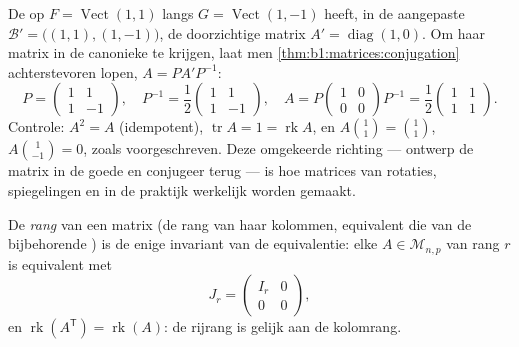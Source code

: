 \begin{example}
\label{ex:b1:matrices:reverserun}
De  op $F = \operatorname{Vect}(1,1)$ langs $G =
\operatorname{Vect}(1,-1)$ heeft, in de aangepaste  $\mathcal
B' = \bigl((1,1),(1,-1)\bigr)$, de doorzichtige matrix $A' =
\operatorname{diag}(1, 0)$. Om haar matrix in de canonieke  te
krijgen, laat men \cref{thm:b1:matrices:conjugation} achterstevoren
lopen, $A = P A' P^{-1}$:
\[
P = \begin{pmatrix} 1 & 1\\ 1 & -1\end{pmatrix},
\quad
P^{-1} = \frac12\begin{pmatrix} 1 & 1\\ 1 & -1\end{pmatrix},
\quad
A = P\begin{pmatrix} 1 & 0\\ 0 & 0\end{pmatrix}P^{-1}
= \frac12\begin{pmatrix} 1 & 1\\ 1 & 1\end{pmatrix}.
\]
Controle: $A^2 = A$ (idempotent), $\operatorname{tr} A = 1 =
\operatorname{rk} A$, en $A\binom{1}{1} = \binom11$,
$A\binom{1}{-1} = 0$, zoals voorgeschreven. Deze omgekeerde
richting --- ontwerp de matrix in de goede  en conjugeer terug
--- is hoe matrices van rotaties, spiegelingen en  in de
praktijk werkelijk worden gemaakt.
\end{example}

\begin{theorem}\label{thm:b1:matrices:rank}
De \emph{rang} van een matrix (de rang van haar kolommen, equivalent
die van de bijbehorende ) is de enige invariant
van de equivalentie: elke $A \in \mathcal{M}_{n,p}$ van rang $r$ is
equivalent met
\[
J_r = \begin{pmatrix} I_r & 0 \\ 0 & 0 \end{pmatrix},
\]
en $\operatorname{rk}(A^{\mathsf T}) = \operatorname{rk}(A)$: de
rijrang is gelijk aan de kolomrang.
\end{theorem}

